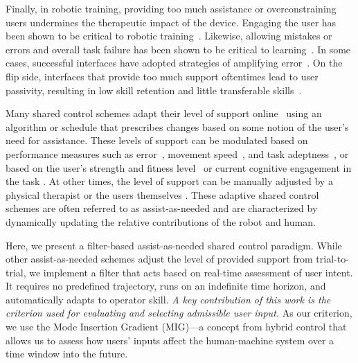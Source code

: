
Finally, in robotic training, providing too much assistance or overconstraining users undermines the therapeutic impact of the device. Engaging the user has been shown to be critical to robotic training~\cite{marchal2009}. Likewise, allowing mistakes or errors and overall task failure has been shown to be critical to learning~\cite{thoroughman2000learning}. In some cases, successful interfaces have adopted strategies of amplifying error~\cite{emken2007motor, patton2006evaluation}. On the flip side, interfaces that provide too much support oftentimes lead to user passivity, resulting in low skill retention and little transferable skills~\cite{schmidt1992new, winstein1994effects}. 

Many shared control schemes adapt their level of support online~\cite{emken2008,riener2005,wolbrecht2008, ellis2009} using an algorithm or schedule that prescribes changes based on some notion of the user's need for assistance. These levels of support can be modulated based on performance measures such as error~\cite{fisher2014,marchal2009, reinkensmeyer2016intro,patton2006error}, movement speed~\cite{kahn2004}, and task adeptness~\cite{krebs2003}, or based on the user's strength and fitness level~\cite{lokomat_clinical_study,RSS_exo2013} or current cognitive engagement in the task \cite{assistance_in_distraction}. At other times, the level of support can be manually adjusted by a physical therapist or the users themselves \cite{exoskeletons}. These adaptive shared control schemes are often referred to as assist-as-needed and are characterized by dynamically updating the relative contributions of the robot and human.

Here, we present a filter-based assist-as-needed shared control paradigm. While other assist-as-needed schemes adjust the level of provided support from trial-to-trial, we implement a filter that acts based on real-time assessment of user intent. It requires no predefined trajectory, runs on an indefinite time horizon, and automatically adapts to operator skill. \textit{A key contribution of this work is the criterion used for evaluating and selecting admissible user input.} As our criterion, we use the Mode Insertion Gradient (MIG)---a concept from hybrid control that allows us to assess how users' inputs affect the human-machine system over a time window into the future. 

